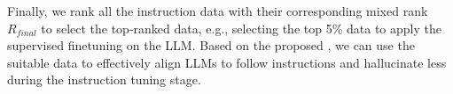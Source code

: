 Finally, we rank all the instruction data with their corresponding mixed rank $R_{final}$ to select the top-ranked data, e.g., selecting the top 5\% data to apply the supervised finetuning on the LLM.
Based on the proposed \OURS, we can use the suitable data to effectively align LLMs to follow instructions and hallucinate less during the instruction tuning stage.



\label{section:ranking}
